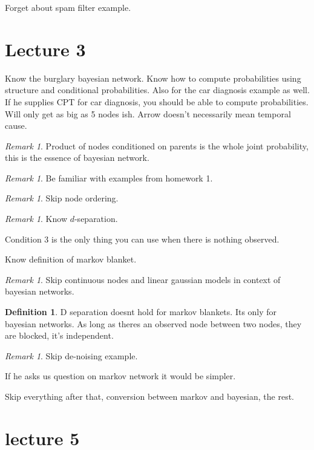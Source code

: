 \documentclass{amsbook}
\theoremstyle{plain}
\numberwithin{section}{chapter}
\numberwithin{equation}{chapter}
\theoremstyle{definition}
\newtheorem{Def}[theorem]{Definition}
\theoremstyle{remark}
\newtheorem{rem}[theorem]{Remark}
\begin{document}
Forget about spam filter example. 

\section{Lecture 3}

Know the burglary bayesian network. Know how to compute probabilities using structure and conditional probabilities. Also for the car diagnosis example as well. If he supplies CPT for car diagnosis, you should be able to compute probabilities. Will only get as big as 5 nodes ish. Arrow doesn't necessarily mean temporal cause. 

\begin{rem}
Product of nodes conditioned on parents is the whole joint probability, this is the essence of bayesian network. 
\end{rem}

\begin{rem}
Be familiar with examples from homework 1. 
\end{rem}

\begin{rem}
Skip node  ordering. 
\end{rem}

\begin{rem}
Know $d$-separation. 
\end{rem}

Condition 3 is the only thing you can use when there is nothing observed. 

Know definition of markov blanket. 

\begin{rem}
Skip continuous nodes and linear gaussian models in context of bayesian networks. 
\end{rem}

\begin{Def}
D separation doesnt hold for markov blankets. Its only for bayesian networks. As long as theres an observed node between two nodes, they are blocked, it's independent. 
\end{Def}

\begin{rem}
Skip de-noising example. 
\end{rem}

If he asks us question on markov network it would be simpler. 

Skip everything after that, conversion between markov and bayesian, the rest. 

\section{lecture 5}
\end{document}
